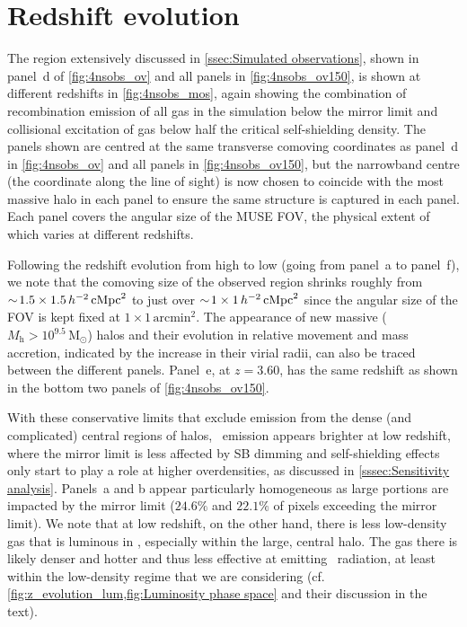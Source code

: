 \section{Redshift evolution}
\label{ap:Redshift evolution}

The region extensively discussed in \cref{ssec:Simulated observations}, shown in panel~d of \cref{fig:4nsobs_ov} and all panels in \ref{fig:4nsobs_ov150}, is shown at different redshifts in \cref{fig:4nsobs_mos}, again showing the combination of recombination emission of all gas in the simulation below the mirror limit and collisional excitation of gas below half the critical self-shielding density. The panels shown are centred at the same transverse comoving coordinates as panel~d in \cref{fig:4nsobs_ov} and all panels in \ref{fig:4nsobs_ov150}, but the narrowband centre (the coordinate along the line of sight) is now chosen to coincide with the most massive halo in each panel to ensure the same structure is captured in each panel. Each panel covers the angular size of the MUSE FOV, the physical extent of which varies at different redshifts.

Following the redshift evolution from high to low (going from panel~a to panel~f), we note that the comoving size of the observed region shrinks roughly from $\sim \! 1.5 \times 1.5 \, h^{-2} \, \mathrm{cMpc}^2$ to just over $\sim \! 1 \times 1 \, h^{-2} \, \mathrm{cMpc}^2$ since the angular size of the FOV is kept fixed at $1 \times 1 \, \mathrm{arcmin}^2$. The appearance of new massive ($M_\mathrm{h} > 10^{9.5} \, \mathrm{M_\odot}$) halos and their evolution in relative movement and mass accretion, indicated by the increase in their virial radii, can also be traced between the different panels. Panel~e, at $z=3.60$, has the same redshift as shown in the bottom two panels of \cref{fig:4nsobs_ov150}.

With these conservative limits that exclude emission from the dense (and complicated) central regions of halos, \lya\ emission appears brighter at low redshift, where the mirror limit is less affected by SB dimming and self-shielding effects only start to play a role at higher overdensities, as discussed in \cref{sssec:Sensitivity analysis}. Panels~a and b appear particularly homogeneous as large portions are impacted by the mirror limit ($24.6\%$ and $22.1\%$ of pixels exceeding the mirror limit). We note that at low redshift, on the other hand, there is less low-density gas that is luminous in \lya, especially within the large, central halo. The gas there is likely denser and hotter and thus less effective at emitting \lya\ radiation, at least within the low-density regime that we are considering (cf. \cref{fig:z_evolution_lum,fig:Luminosity phase space} and their discussion in the text).